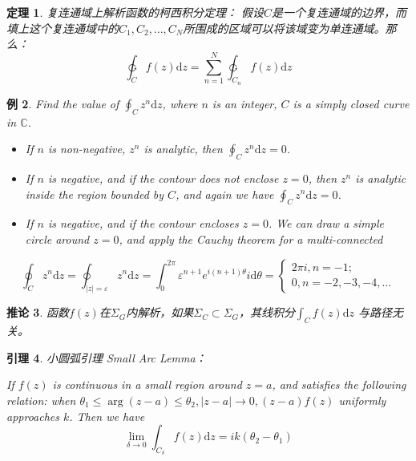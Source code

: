 \documentclass[10pt, a4paper, oneside]{ctexbook}
\newtheorem{theorem}{定理}[section]
\newtheorem{lemma}[theorem]{引理}
\newtheorem{corollary}[theorem]{推论}
\newtheorem{example}[theorem]{例}
\def\D{\mathrm{d}}
\newcommand{\F}[1][z]
{\ensuremath{f(#1)}}
\begin{document}
\begin{theorem}
    \label{cit2}
    复连通域上解析函数的柯西积分定理：
    假设$C$是一个复连通域的边界，而填上这个复连通域中的$C_1,C_2,\dots,C_N$所围成的区域可以将该域变为单连通域。那么：
    $$ \ointctrclockwise_C \F \D z= \sum_{n=1}^N \ointctrclockwise_{C_n} \F \D z$$
\end{theorem}
\begin{example}
    Find the value of $\displaystyle \oint_{C} z^{n} \D z$, where $n$ is an integer, $C$ is a simply closed curve in $\mathbb{C}$.
    \begin{itemize} \rm
        \item  If $n$ is non-negative, $z^{n}$ is analytic, then $\displaystyle \oint_{C} z^{n} \D z=0$.
        \item  If $n$ is negative, and if the contour does not enclose $z=0$, then $z^{n}$ is analytic inside the region bounded by $C$, and again we have $\displaystyle \oint_{C} z^{n} \D z=0$.
        \item  If $n$ is negative, and if the contour encloses $z=0$. We can draw a simple circle around $z=0$, and apply the Cauchy theorem for a multi-connected
    \end{itemize}
    \begin{equation*}
        \oint_{C} z^{n} \D z=\oint_{|z|=\varepsilon} z^{n} \D z=\int_{0}^{2 \pi} \varepsilon^{n+1} e^{i(n+1) \theta} i \D \theta=\left\{\begin{array}{l}
            2 \pi i, n=-1 ; \\
            0, n=-2,-3,-4, \ldots
        \end{array}\right.
    \end{equation*}
\end{example}
\begin{corollary}
    函数$f(z)$在$\Sigma_G$内解析，如果$\Sigma_C\subset \Sigma_G$，其线积分$\displaystyle \int_C f(z)\D z$ 与路径无关。
\end{corollary}

\newpage

\begin{lemma}
    {\rm 小圆弧引理} Small Arc Lemma：

    {\rm If $f(z)$ is continuous in a small region around $z=a$, and satisfies the following relation: when $\theta_{1} \leq \arg (z-a) \leq \theta_{2},|z-a| \rightarrow 0,(z-a) f(z)$ uniformly approaches $k$. Then we have}
    $$\lim _{\delta \rightarrow 0} \int_{C_{\delta}} f(z) \D z=i k\left(\theta_{2}-\theta_{1}\right)$$
\end{lemma}
\end{document}
